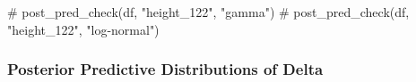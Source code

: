 \documentclass[
  letterpaper,
  DIV=11,
  numbers=noendperiod]{scrartcl}
\newenvironment{Shaded}{\begin{snugshade}}{\end{snugshade}}
\newcommand{\CommentTok}[1]{\textcolor[rgb]{0.37,0.37,0.37}{#1}}
\newcommand{\FunctionTok}[1]{\textcolor[rgb]{0.28,0.35,0.67}{#1}}
\newcommand{\NormalTok}[1]{\textcolor[rgb]{0.00,0.23,0.31}{#1}}
\newcommand{\OtherTok}[1]{\textcolor[rgb]{0.00,0.23,0.31}{#1}}
\newcommand{\SpecialCharTok}[1]{\textcolor[rgb]{0.37,0.37,0.37}{#1}}
\newcommand{\StringTok}[1]{\textcolor[rgb]{0.13,0.47,0.30}{#1}}
\begin{document}
\begin{Shaded}
\begin{Highlighting}[]
\CommentTok{\# post\_pred\_check(df, "height\_122", "gamma")}
\CommentTok{\# post\_pred\_check(df, "height\_122", "log{-}normal")}
\end{Highlighting}
\end{Shaded}

\subsubsection{Posterior Predictive Distributions of
Delta}\label{posterior-predictive-distributions-of-delta}

\begin{Shaded}
\end{Shaded}
\end{document}
